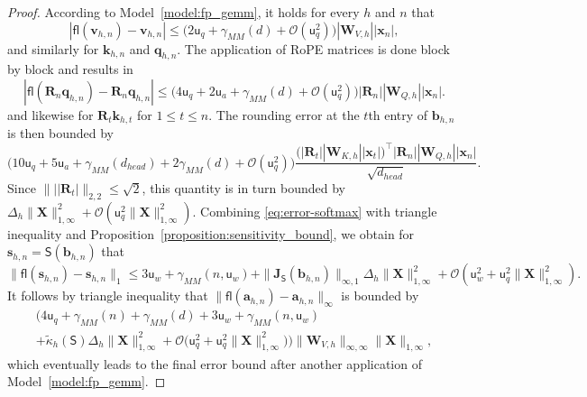 \documentclass[namedate,webpdf,imanum]{ima-authoring-template}
\newcommand{\Matrix}[1]{\mathbf{#1}}
\newcommand{\trans}{\intercal}
\newcommand{\Norm}[3][]{#1\| #2 #1\|_{\mathrm{#3}}}
\newcommand{\Layer}[1]{\mathsf{#1}}
\newcommand{\fl}[2][]{\mathsf{fl}#1( #2 #1)}
\newcommand{\uh}{\mathsf{u}}
\newcommand{\Oh}[2][]{\mathcal{O}#1( #2 #1)}
\numberwithin{equation}{section}
\begin{document}
\begin{proof}
According to Model~\ref{model:fp_gemm}, it holds for every $h$ and $n$ that
\begin{equation*}
    |\fl{\Matrix{v}_{h,n}} - \Matrix{v}_{h,n}| \leq \Big( 2 \uh_{q} + \gamma_{MM}(d) + \Oh{\uh_{q}^2} \Big) |\Matrix{W}_{V,h}| |\Matrix{x}_n|,
\end{equation*}
and similarly for $\Matrix{k}_{h,n}$ and $\Matrix{q}_{h,n}$.
The application of RoPE matrices is done block by block and results in
\begin{equation*}
    |\fl{\Matrix{R}_{n} \Matrix{q}_{h,n}} - \Matrix{R}_n \Matrix{q}_{h,n}| \leq \Big( 4 \uh_{q} + 2 \uh_a + \gamma_{MM}(d) + \Oh{\uh_{q}^2} \Big) |\Matrix{R}_{n}| |\Matrix{W}_{Q,h}| |\Matrix{x}_n|.
\end{equation*}
and likewise for $\Matrix{R}_t \Matrix{k}_{h,t}$ for $1 \leq t \leq n$.
The rounding error at the $t$th entry of $\Matrix{b}_{h,n}$ is then bounded by
\begin{equation*}
    \Big(10 \uh_{q} + 5\uh_{a} + \gamma_{MM}(d_{head}) + 2\gamma_{MM}(d) + \Oh{\uh_{q}^2}\Big) \frac{\big( |\Matrix{R}_{t}| |\Matrix{W}_{K,h}| |\Matrix{x}_t| \big)^\trans |\Matrix{R}_{n}| |\Matrix{W}_{Q,h}| |\Matrix{x}_n|}{\sqrt{d_{head}}}.
\end{equation*}
Since $\Norm{||\Matrix{R}_t|}{2,2} \leq \sqrt{2}$, this quantity is in turn bounded by $\Delta_h \Norm{\Matrix{X}}{1,\infty}^2 + \Oh{\uh_q^2 \Norm{\Matrix{X}}{1,\infty}^2}$.
Combining \eqref{eq:error-softmax} with triangle inequality and Proposition~\ref{proposition:sensitivity_bound}, we obtain for $\Matrix{s}_{h,n} = \Layer{S}(\Matrix{b}_{h,n})$ that
\begin{equation*}
    \Norm{\fl{\Matrix{s}_{h,n}} - \Matrix{s}_{h,n}}{1} \leq 3 \uh_{w} + \gamma_{MM}(n,\uh_w) + \Norm{\Matrix{J}_{\Layer{S}}(\Matrix{b}_{h,n})}{\infty,1} \Delta_h \Norm{\Matrix{X}}{1,\infty}^2 + \Oh{\uh_{w}^2 + \uh_q^2 \Norm{\Matrix{X}}{1,\infty}^2}.
\end{equation*}
It follows by triangle inequality that $\Norm{\fl{\Matrix{a}_{h,n}} - \Matrix{a}_{h,n}}{\infty}$ is bounded by
\begin{multline*}
    \Big( 4 \uh_{q} + \gamma_{MM}(n) + \gamma_{MM}(d) + 3 \uh_{w} + \gamma_{MM}(n,\uh_w) \\
    + \tilde{\kappa}_{h}(\Layer{S}) \Delta_h \Norm{\Matrix{X}}{1,\infty}^2 + \Oh[\big]{\uh_q^2 + \uh_q^2 \Norm{\Matrix{X}}{1,\infty}^2} \Big) \Norm{\Matrix{W}_{V,h}}{\infty,\infty} \Norm{\Matrix{X}}{1,\infty},
\end{multline*}
which eventually leads to the final error bound after another application of Model~\ref{model:fp_gemm}.
\end{proof}
\end{document}
